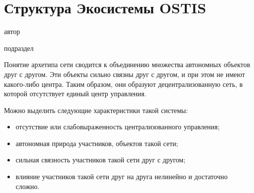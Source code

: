 \chapter{Структура Экосистемы OSTIS}
\label{chapter_ecosystem}

\vspace{-7\baselineskip}

\begin{SCn}
\begin{scnrelfromlist}{автор}
\end{scnrelfromlist}

\bigskip


\bigskip

\begin{scnrelfromlist}{подраздел}
\end{scnrelfromlist}

\end{SCn}

Понятие архетипа сети сводится к объединению множества автономных объектов друг с другом. Эти объекты сильно связны друг с другом, и при этом не имеют какого-либо центра. Таким образом, они образуют децентрализованную сеть, в которой отсутствует единый центр управления.

Можно выделить следующие характеристики такой системы:
\begin{itemize}
    \item отсутствие или слабовыраженность централизованного управления;
    \item автономная природа участников, объектов такой сети;
    \item сильная связность участников такой сети друг с другом;
    \item влияние участников такой сети друг на друга нелинейно и достаточно сложно.
\end{itemize}

